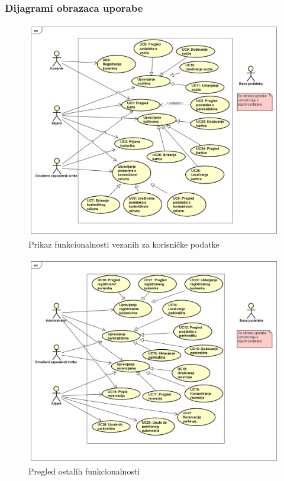\subsubsection{Dijagrami obrazaca uporabe}
\begin{figure}[H]
	\includegraphics[width=1\linewidth]{slike/Korisnički podaci.PNG} %
	\caption{Prikaz funkcionalnosti vezanih za korisničke podatke}
	\label{fig:promjene2} %
\end{figure}
\begin{figure}[H]
	\includegraphics[width=1\linewidth]{slike/Pregled ostalih funkcionalnosti.PNG} %
	\caption{Pregled ostalih funkcionalnosti}
	\label{fig:promjene2} %
\end{figure}
\eject		

